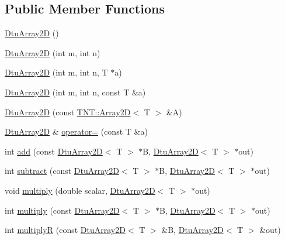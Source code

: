 \subsection*{Public Member Functions}
\begin{DoxyCompactItemize}
\item 
\hyperlink{classDTU_1_1DtuArray2D_a6e06c78ecfbd2efdbe3c3e13df18c4c7}{Dtu\-Array2\-D} ()
\item 
\hyperlink{classDTU_1_1DtuArray2D_a1095f0d0a7f8ca187c15b4ef5488f68d}{Dtu\-Array2\-D} (int m, int n)
\item 
\hyperlink{classDTU_1_1DtuArray2D_af581f4e57787b3d46be392ce28f75fe9}{Dtu\-Array2\-D} (int m, int n, T $\ast$a)
\item 
\hyperlink{classDTU_1_1DtuArray2D_a1190f5752ba914133a2a77449ce56a05}{Dtu\-Array2\-D} (int m, int n, const T \&a)
\item 
\hyperlink{classDTU_1_1DtuArray2D_a88e0a39a0a5e84e14eee359ebb2bd3e1}{Dtu\-Array2\-D} (const \hyperlink{classTNT_1_1Array2D}{T\-N\-T\-::\-Array2\-D}$<$ T $>$ \&A)
\item 
\hyperlink{classDTU_1_1DtuArray2D}{Dtu\-Array2\-D} \& \hyperlink{classDTU_1_1DtuArray2D_a3ce392195f883257dc8133f7fab9564d}{operator=} (const T \&a)
\item 
int \hyperlink{classDTU_1_1DtuArray2D_a1c57e7cdb472b95640e16f69b664d797}{add} (const \hyperlink{classDTU_1_1DtuArray2D}{Dtu\-Array2\-D}$<$ T $>$ $\ast$B, \hyperlink{classDTU_1_1DtuArray2D}{Dtu\-Array2\-D}$<$ T $>$ $\ast$out)
\item 
int \hyperlink{classDTU_1_1DtuArray2D_aef64358747786ad8a0223161086cc7d0}{subtract} (const \hyperlink{classDTU_1_1DtuArray2D}{Dtu\-Array2\-D}$<$ T $>$ $\ast$B, \hyperlink{classDTU_1_1DtuArray2D}{Dtu\-Array2\-D}$<$ T $>$ $\ast$out)
\item 
void \hyperlink{classDTU_1_1DtuArray2D_aa395f408b57f194d773d309b5bcb3107}{multiply} (double scalar, \hyperlink{classDTU_1_1DtuArray2D}{Dtu\-Array2\-D}$<$ T $>$ $\ast$out)
\item 
int \hyperlink{classDTU_1_1DtuArray2D_af5b3ec0622fd426688ea0ab77b26db51}{multiply} (const \hyperlink{classDTU_1_1DtuArray2D}{Dtu\-Array2\-D}$<$ T $>$ $\ast$B, \hyperlink{classDTU_1_1DtuArray2D}{Dtu\-Array2\-D}$<$ T $>$ $\ast$out)
\item 
int \hyperlink{classDTU_1_1DtuArray2D_abfd1831b2f3ff56bb30ebae5a5b59b63}{multiply\-R} (const \hyperlink{classDTU_1_1DtuArray2D}{Dtu\-Array2\-D}$<$ T $>$ \&B, \hyperlink{classDTU_1_1DtuArray2D}{Dtu\-Array2\-D}$<$ T $>$ \&out)
\item 

\end{DoxyCompactItemize}
